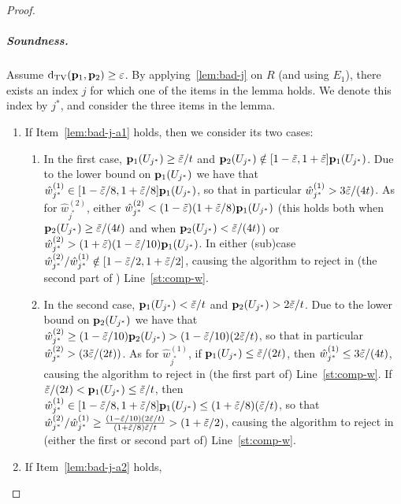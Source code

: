 \begin{proof}
\subparagraph{Soundness.}
Assume {$\operatorname{d}_{\textrm{TV}}(\mathbf{p}_1,\mathbf{p}_2) \geq \varepsilon$}. By applying~\cref{lem:bad-j} on $R$ (and using $E_1$), there exists an index $j$ for which one of the items in the lemma holds. We denote this index by $j^\ast$, and consider the three items in the lemma.
\begin{enumerate}
\item If Item~\ref{lem:bad-j-a1} holds, then
we consider its two cases:
  \begin{enumerate}
  \item In the first case, $\mathbf{p}_1(U_{j^\ast}) \geq \tilde{\varepsilon}/t$ and
  $\mathbf{p}_2(U_{j^\ast}) \notin [1-\tilde{\varepsilon},1+\tilde{\varepsilon}]\mathbf{p}_1(U_{j^\ast})$. Due to the lower
  bound on $\mathbf{p}_1(U_{j^\ast})$ we have that
  $\hat{w}^{(1)}_{j^\ast} \in [1-\tilde{\varepsilon}/8,1+\tilde{\varepsilon}/8]\mathbf{p}_1(U_{j^\ast})$,
  so that in particular $\hat{w}^{(1)}_{j^\ast} > 3\tilde{\varepsilon}/(4t)$.
  As for $\hat{w}^{(2)}_{j^\ast}$,
  either $\hat{w}^{(2)}_{j^\ast} < (1-\tilde{\varepsilon})(1+\tilde{\varepsilon}/8)\mathbf{p}_1(U_{j^\ast})$
  (this holds both when $\mathbf{p}_2(U_{j^\ast})\geq \tilde{\varepsilon}/(4t)$ and when
  $\mathbf{p}_2(U_{j^\ast})< \tilde{\varepsilon}/(4t)$)
  or $\hat{w}^{(2)}_{j^\ast} >(1+\tilde{\varepsilon})(1-\tilde{\varepsilon}/10)\mathbf{p}_1(U_{j^\ast})$.
  In either (sub)case $\hat{w}^{(2)}_{j^\ast}/\hat{w}^{(1)}_{j^\ast}\notin [1-\tilde{\varepsilon}/2,1+\tilde{\varepsilon}/2]$,
  causing the algorithm to
  reject in (the second part of ) Line~\ref{st:comp-w}.
  \item In the second case, \mbox{$\mathbf{p}_1(U_{j^\ast}) < \tilde{\varepsilon}/t$} and
  $\mathbf{p}_2(U_{j^\ast}) > 2\tilde{\varepsilon}/t$. Due to the lower bound on
  $\mathbf{p}_2(U_{j^\ast})$ we have that
  $\hat{w}^{(2)}_{j^\ast} \geq (1-\tilde{\varepsilon}/10)\mathbf{p}_2(U_{j^\ast}) >(1-\tilde{\varepsilon}/10)(2\tilde{\varepsilon}/t)$,
  so that in particular $\hat{w}^{(2)}_{j^\ast} > (3\tilde{\varepsilon}/(2t))$.
  As for $\hat{w}^{(1)}_{j^\ast}$, if $\mathbf{p}_1(U_{j^\ast}) \leq \tilde{\varepsilon}/(2t)$, then
   $\hat{w}^{(1)}_{j^\ast} \leq 3\tilde{\varepsilon}/(4t)$,  causing the algorithm
   to reject in (the first part of) Line~\ref{st:comp-w}.
   If $\tilde{\varepsilon}/(2t)< \mathbf{p}_1(U_{j^\ast}) \leq \tilde{\varepsilon}/t $, then
   $\hat{w}^{(1)}_{j^\ast} \in [1-\tilde{\varepsilon}/8,1+\tilde{\varepsilon}/8]\mathbf{p}_1(U_{j^\ast})
      \leq (1+\tilde{\varepsilon}/8)(\tilde{\varepsilon}/t)$, so that
   $\hat{w}^{(2)}_{j^\ast} /\hat{w}^{(1)}_{j^\ast}
       \geq \frac{(1-\tilde{\varepsilon}/10)(2\tilde{\varepsilon}/t)}{(1+\tilde{\varepsilon}/8)\tilde{\varepsilon}/t}>(1+\tilde{\varepsilon}/2)$,
   causing the algorithm
   to reject in (either the first or second part
   of) Line~\ref{st:comp-w}.
  \end{enumerate}
\item If Item~\ref{lem:bad-j-a2} holds,

\end{enumerate}
\end{proof}
